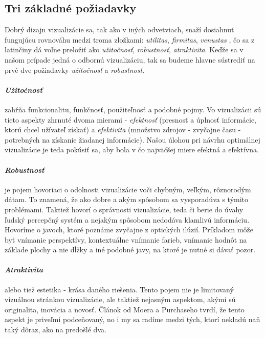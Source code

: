 \subsection{Tri základné požiadavky}
Dobrý dizajn vizualizácie sa, tak ako v iných odvetviach, snaží dosiahnuť fungujúcu rovnováhu medzi troma zložkami: \textit{utilitas}, \textit{firmitas}, \textit{venustas} \cite{RoleOfDesign}, čo sa z latinčiny dá voľne preložiť ako \textit{užitočnosť}, \textit{robustnosť}, \textit{atraktivita}. Keďže sa v našom prípade jedná o odbornú vizualizáciu, tak sa budeme hlavne sústrediť na prvé dve požiadavky \textit{užitočnosť} a \textit{robustnosť}.
	
\paragraph{\textit{Užitočnosť}} zahŕňa funkcionalitu, funkčnosť, použiteľnosť a podobné pojmy. Vo vizualizácii sú tieto aspekty zhrnuté dvoma mierami - \textit{efektnosť} (presnosť a úplnosť informácie, ktorú chcel užívateľ získať) a \textit{efektivita} (množstvo zdrojov - zvyčajne času - potrebných na získanie žiadanej informácie). Našou úlohou pri návrhu optimálnej vizualizácie je teda pokúsiť sa, aby bola v čo najväčšej miere efektná a efektívna. 


\paragraph{\textit{Robustnosť}} je pojem hovoriaci o odolnosti vizualizácie voči chybným, veľkým, rôznorodým dátam. To znamená, že ako dobre a akým spôsobom sa vysporadúva s týmito problémami. Taktiež hovorí o správnosti vizualizácie, teda či berie do úvahy ľudský percepčný systém a nejakým spôsobom nedodáva klamlivú informáciu. Hovoríme o javoch, ktoré poznáme zvyčajne z optických ilúzií. Príkladom môže byť vnímanie perspektívy, kontextuálne vnímanie farieb, vnímanie hodnôt na základe plochy a nie dĺžky a iné podobné javy, na ktoré je nutné si dávať pozor.


\paragraph{\textit{Atraktivita}} alebo tiež estetika - krása daného riešenia. Tento pojem nie je limitovaný vizuálnou stránkou vizualizácie, ale taktiež nejasným aspektom, akými sú originalita, inovácia a novosť. Článok od Moera a Purchaseho \cite{RoleOfDesign} tvrdí, že tento aspekt je priveľmi podceňovaný, no i my sa radíme medzi tých, ktorí nekladú naň taký dôraz, ako na predošlé dva.


